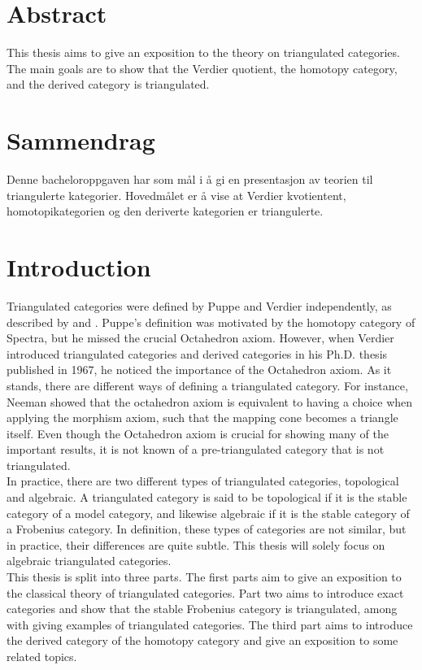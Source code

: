 \chapter*{Abstract}
    This thesis aims to give an exposition to the theory on triangulated categories. The main goals are to show that the Verdier quotient, the homotopy category, and the derived category is triangulated.

\chapter*{Sammendrag}
    Denne bacheloroppgaven har som mål i å gi en presentasjon av teorien til triangulerte kategorier. Hovedmålet er å vise at Verdier kvotientent, homotopikategorien og den deriverte kategorien er triangulerte.

\chapter*{Introduction}

    Triangulated categories were defined by Puppe and Verdier independently, as described by \cite{Kra21} and \cite{neeman}. Puppe's definition was motivated by the homotopy category of Spectra, but he missed the crucial Octahedron axiom. However, when Verdier introduced triangulated categories and derived categories in his Ph.D. thesis published in 1967, he noticed the importance of the Octahedron axiom. As it stands, there are different ways of defining a triangulated category. For instance, Neeman showed that the octahedron axiom is equivalent to having a choice when applying the morphism axiom, such that the mapping cone becomes a triangle itself. Even though the Octahedron axiom is crucial for showing many of the important results, it is not known of a pre-triangulated category that is not triangulated. \\
    
    In practice, there are two different types of triangulated categories, topological and algebraic. A triangulated category is said to be topological if it is the stable category of a model category, and likewise algebraic if it is the stable category of a Frobenius category. In definition, these types of categories are not similar, but in practice, their differences are quite subtle. This thesis will solely focus on algebraic triangulated categories. \\

    This thesis is split into three parts. The first parts aim to give an exposition to the classical theory of triangulated categories. Part two aims to introduce exact categories and show that the stable Frobenius category is triangulated, among with giving examples of triangulated categories. The third part aims to introduce the derived category of the homotopy category and give an exposition to some related topics. \\

